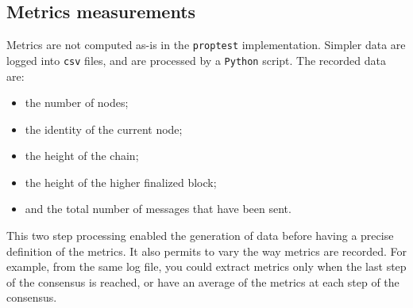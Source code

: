 \subsection{Metrics measurements}
\label{ssec:metricsMeasurements}

Metrics are not computed as-is in the \texttt{proptest} implementation. Simpler
data are logged into \texttt{csv} files, and are processed by a \texttt{Python}
script. The recorded data are: 

\begin{itemize}
    \item the number of nodes;
    \item the identity of the current node;
    \item the height of the chain;
    \item the height of the higher finalized block;
    \item and the total number of messages that have been sent.
\end{itemize}

This two step processing enabled the generation of
data before having a precise definition of the metrics. It also permits to vary
the way metrics are recorded. For example, from the same log file, you could
extract metrics only when the last step of the consensus is reached, or have an
average of the metrics at each step of the consensus.
